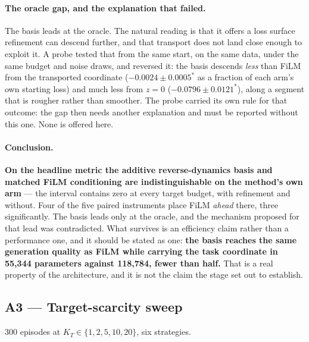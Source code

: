 \documentclass{article}
\begin{document}
\paragraph{The oracle gap, and the explanation that failed.} The basis leads at the oracle.
The natural reading is that it offers a loss surface refinement can descend further, and
that transport does not land close enough to exploit it. A probe tested that from the same
start, on the same data, under the same budget and noise draws, and reversed it: the basis
descends \emph{less} than FiLM from the transported coordinate
($-0.0024 \pm 0.0005^{*}$ as a fraction of each arm's own starting loss) and much less from
$z=0$ ($-0.0796 \pm 0.0121^{*}$), along a segment that is rougher rather than smoother. The
probe carried its own rule for that outcome: the gap then needs another explanation and must
be reported without this one. None is offered here.

\paragraph{Conclusion.} \textbf{On the headline metric the additive reverse-dynamics basis
and matched FiLM conditioning are indistinguishable on the method's own arm} --- the interval
contains zero at every target budget, with refinement and without. Four of the five paired
instruments place FiLM \emph{ahead} there, three significantly. The basis leads only at the
oracle, and the mechanism proposed for that lead was contradicted. What survives is an
efficiency claim rather than a performance one, and it should be stated as one:
\textbf{the basis reaches the same generation quality as FiLM while carrying the task
coordinate in 55{,}344 parameters against 118{,}784, fewer than half.} That is a real
property of the architecture, and it is not the claim the stage set out to establish.

\subsection{A3 --- Target-scarcity sweep}

300 episodes at $K_T \in \{1,2,5,10,20\}$, six strategies.
\end{document}

